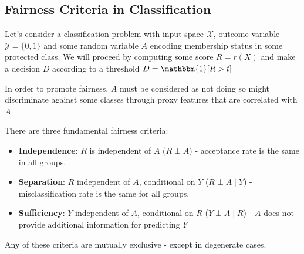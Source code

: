 \documentclass{article}
\newcommand{\ind}{\mathbbm{1}}
\begin{document}
\subsection{Fairness Criteria in Classification}

Let's consider a classification problem with input space $\mathcal{X}$, outcome variable $\mathcal{Y} = \{0,1\}$ and some random variable $A$ encoding membership status in some protected class.
We will proceed by computing some score $R = r(X)$ and make a decision $D$ according to a threshold $D = \ind[R>t]$

In order to promote fairness, $A$ must be considered as not doing so might discriminate against some classes through proxy features that are correlated with $A$.

There are three fundamental fairness criteria:
\begin{itemize}
    \item \textbf{Independence}: $R$ is independent of $A$ ($R \perp A$) - acceptance rate is the same in all groups.
    \item \textbf{Separation}: $R$ independent of $A$, conditional on $Y$ ($R \perp A \mid Y$) - misclassification rate is the same for all groups.
    \item \textbf{Sufficiency}: $Y$ independent of $A$, conditional on $R$ ($Y \perp A \mid R$) - $A$ does not provide additional information for predicting $Y$
\end{itemize}

Any of these criteria are mutually exclusive - except in degenerate cases.
\end{document}

